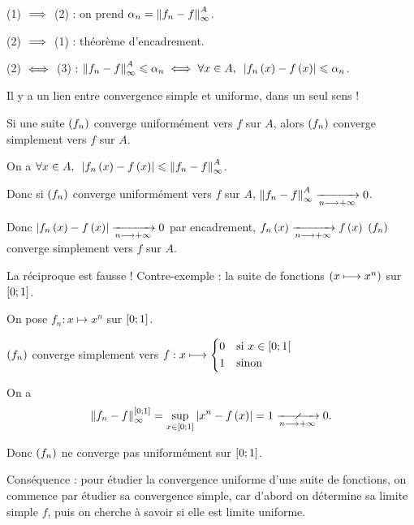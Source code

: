 \begin{dem}
(1) \(\implies\) (2) : on prend \(\alpha_n=\norme{f_n-f}_\infty^A\).

(2) \(\implies\) (1) : théorème d'encadrement.

(2) \(\iff\) (3) : \(\norme{f_n-f}_\infty^A\leq\alpha_n\ssi\quantifs{\forall x\in A}\abs{f_n\paren{x}-f\paren{x}}\leq\alpha_n\).
\end{dem}

Il y a un lien entre convergence simple et uniforme, dans un seul sens !

\begin{theo}
Si une suite \(\left(f_n\right)\) converge uniformément vers \(f\) sur \(A\), alors \(\left(f_n\right)\) converge simplement vers \(f\) sur \(A\).
\end{theo}

\begin{dem}
On a \(\quantifs{\forall x\in A}\abs{f_n\paren{x}-f\paren{x}}\leq\norme{f_n-f}_\infty^A\).

Donc si \(\left(f_n\right)\) converge uniformément vers \(f\) sur \(A\), \(\norme{f_n-f}_\infty^A\tendqd{n\to\pinf}0\).

Donc \(\left\lvert f_n\left(x\right)-f\left(x\right)\right\rvert\xrightarrow[n\longrightarrow+\infty]{}0\) par encadrement, \ie \(f_n\left(x\right)\xrightarrow[n\longrightarrow+\infty]{}f\left(x\right)\) \ie \(\left(f_n\right)\) converge simplement vers \(f\) sur \(A\).
\end{dem}

La réciproque est fausse ! Contre-exemple : la suite de fonctions \(\left(x\longmapsto x^n\right)\) sur \(\left[0;1\right]\).

\begin{dem}
On pose \(f_n:x\mapsto x^n\) sur \(\left[0;1\right]\).

\(\left(f_n\right)\) converge simplement vers \(f:x\longmapsto\begin{dcases}
0 &\text{si }x\in\left[0;1\right[ \\
1 &\text{sinon}
\end{dcases}\)

On a \[\norme{f_n-f}_\infty^{\intervii{0}{1}}=\sup_{x\in\intervii{0}{1}}\abs{x^n-f\paren{x}}=1\ntendqd{n\to\pinf}0.\]

Donc \(\left(f_n\right)\) ne converge pas uniformément sur \(\left[0;1\right]\).
\end{dem}

Conséquence : pour étudier la convergence uniforme d'une suite de fonctions, on commence par étudier sa convergence simple, car d'abord on détermine sa limite simple \(f\), puis on cherche à savoir si elle est limite uniforme.

